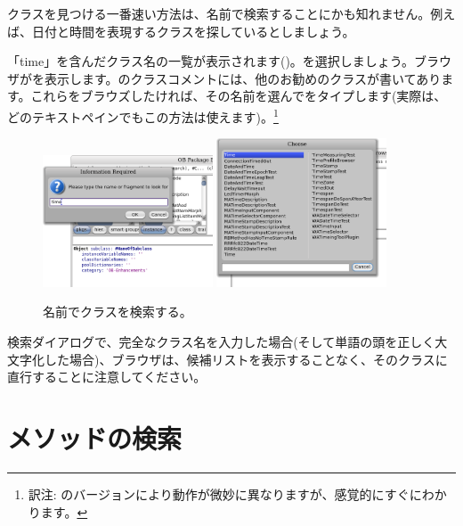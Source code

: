 \documentclass[a4paper,10pt,twoside]{book}
\begin{document}
クラスを見つける一番速い方法は、名前で検索することにかも知れません。例えば、日付と時間を表現するクラスを探しているとしましょう。

\noindent
「time」を含んだクラス名の一覧が表示されます()。を選択しましょう。ブラウザがを表示します。のクラスコメントには、他のお勧めのクラスが書いてあります。これらをブラウズしたければ、その名前を選んでをタイプします(実際は、どのテキストペインでもこの方法は使えます)。\footnote{訳注: \pharo のバージョンにより動作が微妙に異なりますが、感覚的にすぐにわかります。}

\begin{figure}[hbt]
\centerline{
	\includegraphics[width=0.45\textwidth]{FindIt}
	\hspace{1cm}
	\includegraphics[width=0.45\textwidth]{TimeClasses}
}
\caption{名前でクラスを検索する。
}
\end{figure}

検索ダイアログで、完全なクラス名を入力した場合(そして単語の頭を正しく大文字化した場合)、ブラウザは、候補リストを表示することなく、そのクラスに直行することに注意してください。

\section{メソッドの検索}
\end{document}
